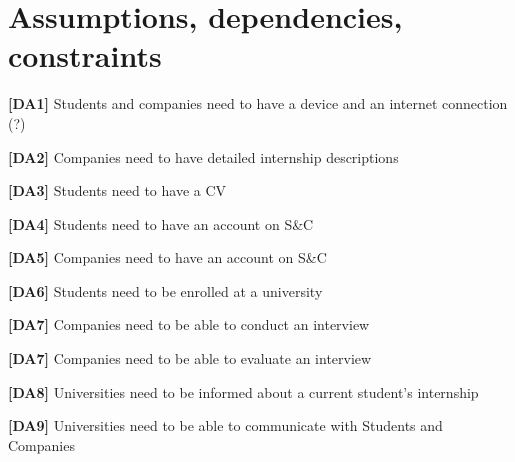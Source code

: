 \section{Assumptions, dependencies, constraints}
\textbf{[DA1] }Students and companies need to have a device and an internet connection (?)

\textbf{[DA2]} Companies need to have detailed internship descriptions

\textbf{[DA3]} Students need to have a CV

\textbf{[DA4]} Students need to have an account on S\&C

\textbf{[DA5]} Companies need to have an account on S\&C

\textbf{[DA6]} Students need to be enrolled at a university 

\textbf{[DA7]} Companies need to be able to conduct an interview

\textbf{[DA7]} Companies need to be able to evaluate an interview

\textbf{[DA8]} Universities need to be informed about a current student's internship

\textbf{[DA9]} Universities need to be able to communicate with Students and Companies
